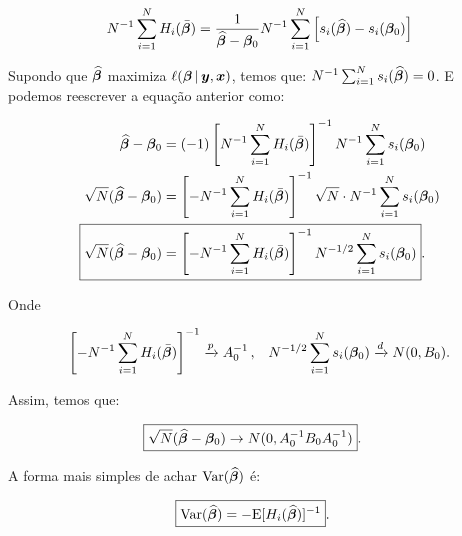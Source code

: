 \documentclass[11pt, oneside, a4paper, article]{article}
\numberwithin{equation}{section}
\begin{document}
\begin{description}
\begin{description}
\vspace{-1 em}
\begin{align*}
N^{-1} \sum_{i=1}^{N} 
H_{i} ( \bar{\boldsymbol{\beta}} ) 
=
\frac{1}{\widehat{\boldsymbol{\beta}} - \boldsymbol{\beta}_{0}}
N^{-1} \sum_{i=1}^{N} 
\left[ 
s_{i}( \widehat{\boldsymbol{\beta}} ) - s_{i}( \boldsymbol{\beta}_{0} )
\right]
\end{align*}

Supondo que
$\widehat{\boldsymbol{\beta}}$
maximiza
$\ell (\boldsymbol{\beta} \, | \, \boldsymbol{y}, \boldsymbol{x})$,
temos que:
$N^{-1} \sum_{i=1}^{N} s_{i}(\widehat{\boldsymbol{\beta}}) = 0$.
E podemos reescrever a equação anterior como:

\vspace{-1 em}
\begin{align*}
\widehat{\mbs{\beta}} - \mbs{\beta}_{0}
&=
(-1)
\left[ N^{-1} \sum_{i=1}^{N} H_{i} ( \bar{\mbs{\beta}} ) \right]^{-1}
N^{-1} \sum_{i=1}^{N} s_{i}( \mbs{\beta}_{0} ) 
\\
\sqrt{N} ( \widehat{\mbs{\beta}} - \mbs{\beta}_{0} )
&=
\left[
- N^{-1} \sum_{i=1}^{N} H_{i} ( \bar{\mbs{\beta}} )
\right]^{-1}
\sqrt{N} \cdot N^{-1} \sum_{i=1}^{N} s_{i}( \mbs{\beta}_{0} ) 
\\
\Aboxed{
\sqrt{N} ( \widehat{\mbs{\beta}} - \mbs{\beta}_{0} )
&=
\left[
- N^{-1} \sum_{i=1}^{N} H_{i} ( \bar{\mbs{\beta}} )
\right]^{-1}
N^{-1/2} \sum_{i=1}^{N} s_{i}( \mbs{\beta}_{0} ) }.
\end{align*}

\noindent
Onde

\vspace{-1 em}
\begin{align*}
\left[ 
- N^{-1} \sum_{i=1}^{N}
H_{i} ( \bar{\boldsymbol{\beta}} ) \right]^{-1}
\xrightarrow{p}
A_{0}^{-1} \, ,
&&
N^{-1/2} \sum_{i=1}^{N} s_{i}( \boldsymbol{\beta}_{0} ) 
\xrightarrow{d}
N( 0, B_{0} ).
\end{align*}

\noindent
Assim, temos que:

\vspace{-1 em}
\begin{align*}
\Aboxed{
\sqrt{N} ( \widehat{\mbs{\beta}} - \mbs{\beta}_{0} )
\to
N ( 0, A_{0}^{-1} B_{0} A_{0}^{-1} )}.
\end{align*}

A forma mais simples de achar $\text{Var} ( {\widehat{\boldsymbol{\beta}}} )$ é:

\vspace{-1 em}
\begin{align*}
	\Aboxed{
\Var( \widehat{\mbs{\beta}} )
&=
- \E[ H_{i} ( \widehat{\mbs{\beta}} ) ]^{-1} }.
\end{align*}


\end{description}
\end{description}
\end{document}
